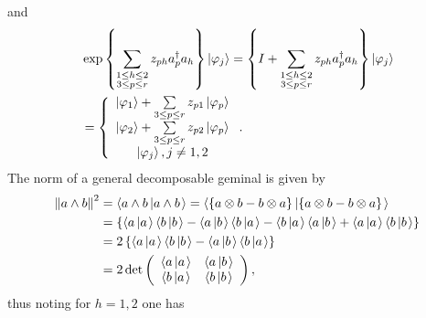 \documentclass[aps,preprint]{revtex4}%
\begin{document}
and
\begin{align}
&  \exp\left\{  \sum\limits_{\substack{1\leq h\leq2\\3\leq p\leq r}%
}z_{ph}a_{p}^{\dagger}a_{h}\right\}  \left\vert \varphi_{j}\right\rangle
=\left\{  I+\sum\limits_{\substack{1\leq h\leq2\\3\leq p\leq r}}z_{ph}%
a_{p}^{\dagger}a_{h}\right\}  \left\vert \varphi_{j}\right\rangle \nonumber\\
&  =\left\{
\begin{array}
[c]{c}%
\left\vert \varphi_{1}\right\rangle +\sum\limits_{3\leq p\leq r}%
z_{p1}\left\vert \varphi_{p}\right\rangle \\
\left\vert \varphi_{2}\right\rangle +\sum\limits_{3\leq p\leq r}%
z_{p2}\left\vert \varphi_{p}\right\rangle \\
\left\vert \varphi_{j}\right\rangle ,j\neq1,2
\end{array}
\right.  .
\end{align}
The norm of a general decomposable geminal is given by
\begin{align}
\left\Vert a\wedge b\right\Vert ^{2}  &  =\left\langle a\wedge b\left\vert
a\wedge b\right.  \right\rangle =\left\langle \left\{  a\otimes b-b\otimes
a\right\}  \left\vert \left\{  a\otimes b-b\otimes a\right\}  \right.
\right\rangle \nonumber\\
&  =\left\{  \left\langle a\left\vert a\right.  \right\rangle \left\langle
b\left\vert b\right.  \right\rangle -\left\langle a\left\vert b\right.
\right\rangle \left\langle b\left\vert a\right.  \right\rangle -\left\langle
b\left\vert a\right.  \right\rangle \left\langle a\left\vert b\right.
\right\rangle +\left\langle a\left\vert a\right.  \right\rangle \left\langle
b\left\vert b\right.  \right\rangle \right\} \nonumber\\
&  =2\left\{  \left\langle a\left\vert a\right.  \right\rangle \left\langle
b\left\vert b\right.  \right\rangle -\left\langle a\left\vert b\right.
\right\rangle \left\langle b\left\vert a\right.  \right\rangle \right\}
\nonumber\\
&  =2\det\left(
\begin{array}
[c]{cc}%
\left\langle a\left\vert a\right.  \right\rangle  & \left\langle a\left\vert
b\right.  \right\rangle \\
\left\langle b\left\vert a\right.  \right\rangle  & \left\langle b\left\vert
b\right.  \right\rangle
\end{array}
\right)  ,
\end{align}
thus noting for $h=1,2$ one has
\end{document}
